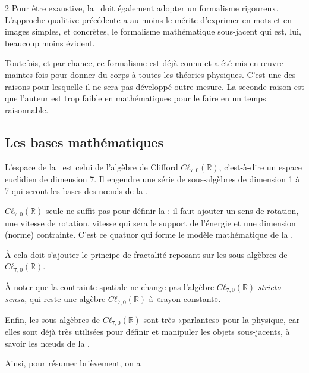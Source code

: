 \begin{multicols}{2}
Pour être exaustive, la \PQ\ doit également adopter un formalisme rigoureux. L'approche qualitive précédente a au moins le
mérite d'exprimer en mots et en images simples, et concrètes, le
formalisme mathématique sous-jacent qui est, lui, beaucoup moins
évident.

Toutefois, et par chance, ce formalisme est déjà connu et a été mis en œuvre
maintes fois pour donner du corps à toutes les théories physiques.
C'est une des raisons pour lesquelle il ne sera pas développé outre mesure. La
seconde raison est que l'auteur est trop faible en mathématiques pour
le faire en un temps raisonnable.

\subsection{Les bases mathématiques}

L'espace de la \PQ\ est celui de l'algèbre de Clifford $Cℓ_{7,0}(\mathbb{R})$,
c'est-à-dire un espace euclidien de dimension 7. Il engendre une série
de sous-algèbres de dimension 1 à 7 qui seront les bases des nœuds de la
\PQ.

$Cℓ_{7,0}(\mathbb{R})$ seule ne suffit pas pour définir la \PQ: il faut ajouter un
sens de rotation, une vitesse de rotation, vitesse qui sera le support
de l'énergie et une dimension (norme) contrainte. C'est ce quatuor qui
forme le modèle mathématique de la \PQ.

À cela doit s'ajouter le principe de fractalité reposant sur les
sous-algèbres de $Cℓ_{7,0}(\mathbb{R})$.

À noter que la contrainte spatiale ne change pas l'algèbre $Cℓ_{7,0}(\mathbb{R})$
\textit{stricto sensu}, qui reste une algèbre $Cℓ_{7,0}(\mathbb{R})$ à «rayon constant».

Enfin, les sous-algèbres de $Cℓ_{7,0}(\mathbb{R})$ sont très «parlantes» pour la
physique, car elles sont déjà très utilisées pour définir et manipuler
les objets sous-jacents, à savoir les nœuds de la \PQ.

Ainsi, pour résumer brièvement, on a


\end{multicols}

